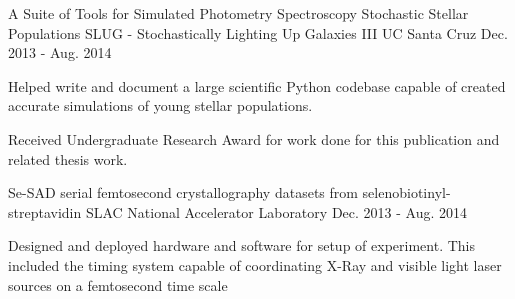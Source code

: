 \begin{cventries}
  \cventry
    {A Suite of Tools for Simulated Photometry Spectroscopy Stochastic Stellar Populations}
    {SLUG - Stochastically Lighting Up Galaxies III}
    {UC Santa Cruz}
    {Dec. 2013 - Aug. 2014}
    {
      \begin{cvitems}
        \item {Helped write and document a large scientific Python codebase capable of created accurate simulations of young stellar populations.}
        \item {Received Undergraduate Research Award for work done for this publication and related thesis work.}
      \end{cvitems}
    }
  \cventry
    {}
    {Se-SAD serial femtosecond crystallography datasets from selenobiotinyl-streptavidin}
    {SLAC National Accelerator Laboratory}
    {Dec. 2013 - Aug. 2014}
    {
      \begin{cvitems}
        \item {Designed and deployed hardware and software for setup of
               experiment. This included the timing system capable of coordinating
               X-Ray and visible light laser sources on a femtosecond time scale}
      \end{cvitems}
    }
\end{cventries}
